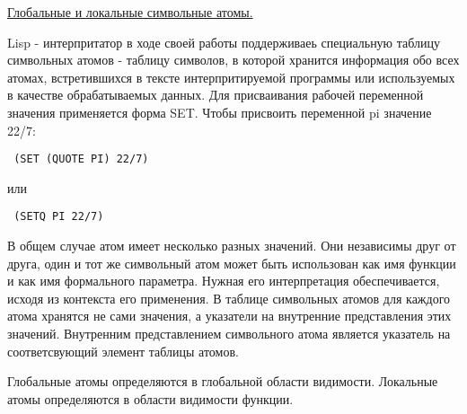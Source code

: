 \newline
\underline{Глобальные и локальные символьные атомы.}


Lisp - интерпритатор в ходе своей работы поддерживаеь специальную таблицу символьных атомов - таблицу символов, в которой хранится информация обо всех атомах, встретившихся в тексте интерпритируемой программы или используемых в качестве обрабатываемых данных. Для присваивания рабочей переменной значения применяется форма SET. Чтобы присвоить переменной pi значение 22/7: 
\begin{lstlisting} (SET (QUOTE PI) 22/7) \end{lstlisting}
или
\begin{lstlisting} (SETQ PI 22/7) \end{lstlisting}



В общем случае атом имеет несколько разных значений. Они независимы друг от
друга, один и тот же символьный атом может быть использован как имя функции и как имя формального параметра. Нужная его интерпретация обеспечивается, исходя из контекста его применения. В таблице символьных атомов для каждого атома хранятся не сами значения, а указатели на внутренние представления 
этих значений. Внутренним представлением символьного атома является указатель на соответсвующий элемент таблицы атомов. 


Глобальные атомы определяются в глобальной области видимости. 
Локальные атомы определяются в области видимости функции. 
\newline